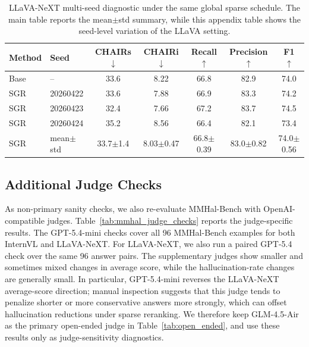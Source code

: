 \documentclass[11pt]{article}
\begin{document}
\begin{table}[h]
  \centering
  \small
  \begin{tabular}{llccccc}
  \hline
  Method & Seed & CHAIRs $\downarrow$ & CHAIRi $\downarrow$ & Recall $\uparrow$ & Precision $\uparrow$ & F1 $\uparrow$ \\
  \hline
  Base & -- & 33.6 & 8.22 & 66.8 & 82.9 & 74.0 \\
  SGR & 20260422 & 33.6 & 7.88 & 66.9 & 83.3 & 74.2 \\
  SGR & 20260423 & 32.4 & 7.66 & 67.2 & 83.7 & 74.5 \\
  SGR & 20260424 & 35.2 & 8.56 & 66.4 & 82.1 & 73.4 \\
  SGR & mean$\pm$std & 33.7$\pm$1.4 & 8.03$\pm$0.47 & 66.8$\pm$0.39 & 83.0$\pm$0.82 & 74.0$\pm$0.56 \\
  \hline
  \end{tabular}
\caption{
  LLaVA-NeXT multi-seed diagnostic under the same global sparse schedule.
  The main table reports the mean$\pm$std summary, while this appendix table shows the seed-level variation of the LLaVA setting.
  }
  \label{tab:appendix_llava_seed}
\end{table}

\subsection{Additional Judge Checks}
\label{app:mmhal_judge_checks}

As non-primary sanity checks, we also re-evaluate MMHal-Bench with OpenAI-compatible judges.
Table~\ref{tab:mmhal_judge_checks} reports the judge-specific results.
The GPT-5.4-mini checks cover all 96 MMHal-Bench examples for both InternVL and LLaVA-NeXT.
For LLaVA-NeXT, we also run a paired GPT-5.4 check over the same 96 answer pairs.
The supplementary judges show smaller and sometimes mixed changes in average score, while the hallucination-rate changes are generally small.
In particular, GPT-5.4-mini reverses the LLaVA-NeXT average-score direction; manual inspection suggests that this judge tends to penalize shorter or more conservative answers more strongly, which can offset hallucination reductions under sparse reranking.
We therefore keep GLM-4.5-Air as the primary open-ended judge in Table~\ref{tab:open_ended}, and use these results only as judge-sensitivity diagnostics.
\end{document}
